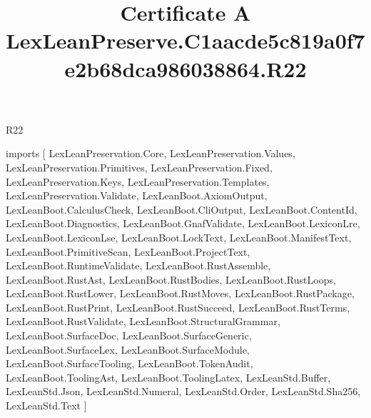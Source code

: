\begin{lexlean}{R22}
\title{Certificate A LexLeanPreserve.C1aacde5c819a0f7e2b68dca986038864.R22}
\begin{coremodule}
imports [
  LexLeanPreservation.Core,
  LexLeanPreservation.Values,
  LexLeanPreservation.Primitives,
  LexLeanPreservation.Fixed,
  LexLeanPreservation.Keys,
  LexLeanPreservation.Templates,
  LexLeanPreservation.Validate,
  LexLeanBoot.AxiomOutput,
  LexLeanBoot.CalculusCheck,
  LexLeanBoot.CliOutput,
  LexLeanBoot.ContentId,
  LexLeanBoot.Diagnostics,
  LexLeanBoot.GnafValidate,
  LexLeanBoot.LexiconLre,
  LexLeanBoot.LexiconLse,
  LexLeanBoot.LockText,
  LexLeanBoot.ManifestText,
  LexLeanBoot.PrimitiveScan,
  LexLeanBoot.ProjectText,
  LexLeanBoot.RuntimeValidate,
  LexLeanBoot.RustAssemble,
  LexLeanBoot.RustAst,
  LexLeanBoot.RustBodies,
  LexLeanBoot.RustLoops,
  LexLeanBoot.RustLower,
  LexLeanBoot.RustMoves,
  LexLeanBoot.RustPackage,
  LexLeanBoot.RustPrint,
  LexLeanBoot.RustSucceed,
  LexLeanBoot.RustTerms,
  LexLeanBoot.RustValidate,
  LexLeanBoot.StructuralGrammar,
  LexLeanBoot.SurfaceDoc,
  LexLeanBoot.SurfaceGeneric,
  LexLeanBoot.SurfaceLex,
  LexLeanBoot.SurfaceModule,
  LexLeanBoot.SurfaceTooling,
  LexLeanBoot.TokenAudit,
  LexLeanBoot.ToolingAst,
  LexLeanBoot.ToolingLatex,
  LexLeanStd.Buffer,
  LexLeanStd.Json,
  LexLeanStd.Numeral,
  LexLeanStd.Order,
  LexLeanStd.Sha256,
  LexLeanStd.Text
]


\end{coremodule}
\end{lexlean}
